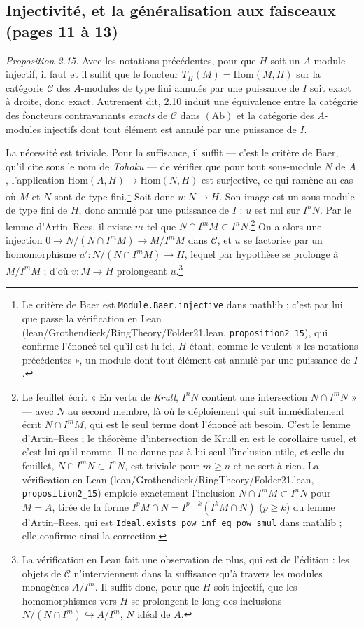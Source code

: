 \documentclass[11pt,a4paper]{article}
\begin{document}
\subsection*{Injectivité, et la généralisation aux faisceaux (pages 11 à 13)}

\emph{Proposition 2.15.} Avec les notations précédentes, pour que $H$ soit un
$A$-module injectif, il faut et il suffit que le foncteur
$T_{H}(M) = \mathrm{Hom}(M,H)$ sur la catégorie $\mathcal{C}$ des $A$-modules de
type fini annulés par une puissance de $I$ soit exact à droite, donc exact.
Autrement dit, 2.10 induit une équivalence entre la catégorie des foncteurs
contravariants \emph{exacts} de $\mathcal{C}$ dans $(\mathrm{Ab})$ et la
catégorie des $A$-modules injectifs dont tout élément est annulé par une
puissance de $I$.

La nécessité est triviale. Pour la suffisance, il suffit — c'est le critère de
Baer, qu'il cite sous le nom de \emph{Tohoku} — de vérifier que pour tout
sous-module $N$ de $A$, l'application $\mathrm{Hom}(A,H) \to \mathrm{Hom}(N,H)$
est surjective, ce qui ramène au cas où $M$ et $N$ sont de type fini.\footnote{Le
critère de Baer est \texttt{Module.Baer.injective} dans mathlib ; c'est par lui
que passe la vérification en Lean (lean/Grothendieck/RingTheory/Folder21.lean,
\texttt{proposition2\_15}), qui confirme l'énoncé tel qu'il est lu ici, $H$ étant,
comme le veulent « les notations précédentes », un module dont tout élément est
annulé par une puissance de $I$.} Soit donc
$u : N \to H$. Son image est un sous-module de type fini de $H$, donc annulé par
une puissance de $I$ : $u$ est nul sur $I^{n}N$. Par le lemme d'Artin--Rees, il
existe $m$ tel que $N \cap I^{m}M \subset I^{n}N$.\footnote{Le feuillet écrit
« En vertu de \emph{Krull}, $I^{n}N$ contient une intersection $N \cap I^{m}N$ »
— avec $N$ au second membre, là où le déploiement qui suit immédiatement écrit
$N \cap I^{m}M$, qui est le seul terme dont l'énoncé ait besoin. C'est le lemme
d'Artin--Rees ; le théorème d'intersection de Krull en est le corollaire usuel,
et c'est lui qu'il nomme. Il ne donne pas à lui seul l'inclusion utile, et
celle du feuillet, $N \cap I^{m}N \subset I^{n}N$, est triviale pour
$m \geqslant n$ et ne sert à rien. La vérification en Lean
(lean/Grothendieck/RingTheory/Folder21.lean, \texttt{proposition2\_15}) emploie exactement
l'inclusion $N \cap I^{m}M \subset I^{n}N$ pour $M = A$, tirée de la forme
$I^{p}M \cap N = I^{p-k}(I^{k}M \cap N)$ ($p \geqslant k$) du lemme
d'Artin--Rees, qui est \texttt{Ideal.exists\_pow\_inf\_eq\_pow\_smul} dans
mathlib ; elle confirme ainsi la correction.} On a alors une injection
$0 \to N/(N \cap I^{m}M) \to M/I^{m}M$ dans $\mathcal{C}$, et $u$ se factorise
par un homomorphisme $u' : N/(N \cap I^{m}M) \to H$, lequel par hypothèse se
prolonge à $M/I^{m}M$ ; d'où $v : M \to H$ prolongeant $u$.\footnote{La
vérification en Lean fait une observation de plus, qui est de l'édition : les
objets de $\mathcal{C}$ n'interviennent dans la suffisance qu'à travers les
modules monogènes $A/I^{m}$. Il suffit donc, pour que $H$ soit injectif, que les
homomorphismes vers $H$ se prolongent le long des inclusions
$N/(N \cap I^{m}) \hookrightarrow A/I^{m}$, $N$ idéal de $A$.}
\end{document}
